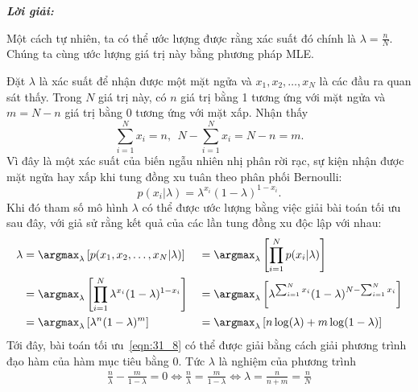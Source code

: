 \textit{\textbf{Lời giải:}}

Một cách tự nhiên, ta có thể ước lượng được rằng xác suất đó chính là $\lambda
= \frac{n}{N}$. Chúng ta cùng ước lượng giá trị này bằng phương pháp MLE. 
 
Đặt $\lambda$ là xác suất để nhận được một mặt ngửa và $x_1, x_2,
\dots, x_N$ là các đầu ra quan sát thấy. Trong $N$ giá trị này, có $n$ giá trị bằng 1 tương ứng
với mặt ngửa và $m = N - n$ giá trị bằng 0 tương ứng với mặt
xấp. Nhận thấy 
\begin{equation} 
  \sum_{i=1}^N x_i = n, ~~N - \sum_{i=1}^N x_i = N - n = m.
\end{equation} 
Vì đây là một xác suất của biến ngẫu nhiên nhị phân rời rạc, sự kiện nhận được mặt ngửa hay xấp khi tung đồng xu tuân theo
phân phối Bernoulli:
\begin{equation} 
p(x_i | \lambda) = \lambda^{x_i} ( 1- \lambda)^{1 - x_i}.
\end{equation} 
Khi đó tham số mô hình $\lambda$ có thể được ước lượng bằng việc giải bài toán
tối ưu sau đây, với giả sử rằng kết quả của các lần tung đồng xu độc lập với
nhau:
\begin{alignat}{3}
  \lambda & =  \argmax_{\lambda}\left[ p(x_1, x_2, \dots, x_N | \lambda)\right] 
  && =  \argmax_{\lambda} \left[\prod_{i = 1}^N p(x_i | \lambda)\right] \\
  \label{eqn:31_6}
  & =  \argmax_{\lambda} \left[\prod_{i=1}^N  \lambda^{x_i} ( 1- \lambda)^{1 - x_i}\right]
  && = \argmax_{\lambda} \left[\lambda^{\sum_{i=1}^N x_i} (1 - \lambda)^{N - \sum_{i=1}^N x_i}\right]  \\\ 
  \label{eqn:31_8}
  & = \argmax_{\lambda} \left[\lambda^{n} (1 - \lambda)^{m}\right] 
  && = \argmax_{\lambda} \left[ n\log(\lambda) + m\log(1 - \lambda) \right] 
\end{alignat} 
Tới đây, bài toán tối ưu~\eqref{eqn:31_8} có thể được giải bằng cách giải phương
trình đạo hàm của hàm mục tiêu bằng 0. Tức $\lambda$ là nghiệm của phương trình
\begin{eqnarray} 
  \frac{n}{\lambda} - \frac{m}{1 - \lambda}  =  0 
  \Leftrightarrow \frac{n}{\lambda}  =  \frac{m}{1 - \lambda} 
  \Leftrightarrow \lambda  =  \frac{n}{n + m} = \frac{n}{N} 
\end{eqnarray} 
 
